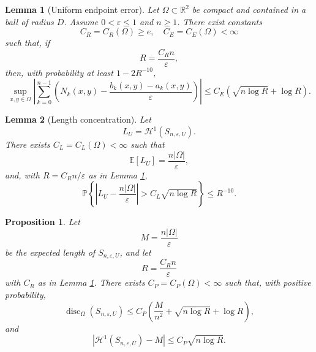 \documentclass[10pt,a4paper]{amsart}
\newtheorem{lemma}{Lemma}
\newtheorem{proposition}{Proposition}
\newcommand{\E}{\mathbb E}
\newcommand{\Prob}{\mathbb P}
\newcommand{\R}{\mathbb R}
\newcommand{\cH}{\mathcal H}
\newcommand{\eps}{\varepsilon}
\begin{document}
\begin{lemma}[Uniform endpoint error]\label{lem:endpoint}
Let $\Omega\subset\R^2$ be compact and contained in a ball of radius $D$. Assume $0<\eps\le1$ and $n\ge1$. There exist constants
\[
        C_R=C_R(\Omega)\ge e,
        \quad
        C_E=C_E(\Omega)<\infty
\]
such that, if
\[
        R=\frac{C_R n}{\eps},
\]
then, with probability at least $1-2R^{-10}$,
\[
        \sup_{x,y\in\Omega}
        \left|
        \sum_{k=0}^{n-1}
        \left(
        N_k(x,y)
        -
        \frac{b_k(x,y)-a_k(x,y)}{\eps}
        \right)
        \right|
        \le
        C_E
        \left(
        \sqrt{n\log R}+\log R
        \right).
\]
\end{lemma}

\begin{lemma}[Length concentration]\label{lem:length}
Let
\[
        L_U=\cH^1(S_{n,\eps,U}).
\]
There exists $C_L=C_L(\Omega)<\infty$ such that
\[
        \E \left[L_U\right]=\frac{n|\Omega|}{\eps},
\]
and, with $R=C_R n/\eps$ as in Lemma \ref{lem:endpoint},
\[
        \Prob\left\{
        \left|
        L_U-\frac{n|\Omega|}{\eps}
        \right|
        >
        C_L\sqrt{n\log R}
        \right\}
        \le
        R^{-10}.
\]
\end{lemma}

\begin{proposition}\label{prop:random}
Let
\[
        M=\frac{n|\Omega|}{\eps}
\]
be the expected length of $S_{n,\eps,U}$, and let
\[
        R=\frac{C_R n}{\eps}
\]
with $C_R$ as in Lemma \ref{lem:endpoint}. There exists $C_P=C_P(\Omega)<\infty$ such that, with positive probability,
\[
        \operatorname{disc}_\Omega(S_{n,\eps,U})
        \le
        C_P
        \left(
        \frac{M}{n^2}
        +
        \sqrt{n\log R}
        +
        \log R
        \right),
\]
and
\[
        \left|
        \cH^1(S_{n,\eps,U})-M
        \right|
        \le
        C_P\sqrt{n\log R}.
\]
\end{proposition}
\end{document}
